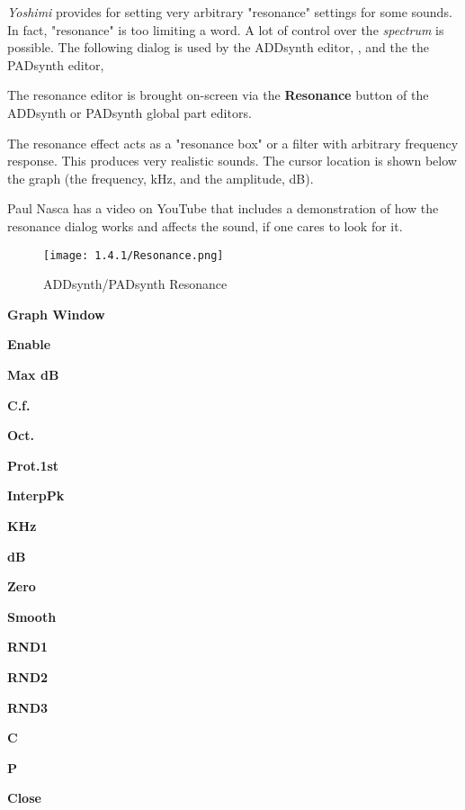    \textsl{Yoshimi} provides for setting very arbitrary "resonance"
   settings for some sounds.  In fact, "resonance" is too limiting a word.
   A lot of control over the \textsl{spectrum} is possible.
   The following dialog is used by
   the ADDsynth editor,
   , and the
   the PADsynth editor,

   The resonance editor is brought on-screen via the
   \textbf{Resonance} button of the ADDsynth or PADsynth
   global part editors.

   The resonance effect acts as a "resonance box" or a filter with arbitrary
   frequency response. This produces very realistic sounds.
   The cursor location is shown below the graph (the frequency, kHz, and
   the amplitude, dB).

   Paul Nasca has a video on YouTube that includes a demonstration of how
   the resonance dialog works and affects the sound, if one cares to look for
   it.

\begin{figure}[H]
   \centering
   \texttt{[image: 1.4.1/Resonance.png]}
   \caption{ADDsynth/PADsynth Resonance}
   \label{fig:addsynth_resonance}
\end{figure}

   \begin{enumber}
      \item \textbf{Graph Window}
      \item \textbf{Enable}
      \item \textbf{Max dB}
      \item \textbf{C.f.}
      \item \textbf{Oct.}
      \item \textbf{Prot.1st}
      \item \textbf{InterpPk}
      \item \textbf{KHz}
      \item \textbf{dB}
      \item \textbf{Zero}
      \item \textbf{Smooth}
      \item \textbf{RND1}
      \item \textbf{RND2}
      \item \textbf{RND3}
      \item \textbf{C}
      \item \textbf{P}
      \item \textbf{Close}
   \end{enumber}


